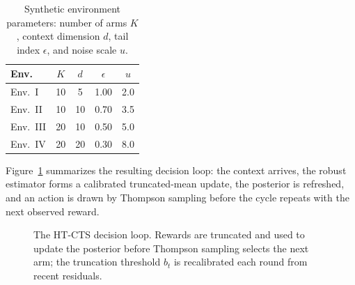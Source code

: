 \begin{table}[t]
  \centering
  \small
  \caption{Synthetic environment parameters: number of arms $K$, context dimension $d$, tail index $\epsilon$, and noise scale $u$.}
  \label{tab:envs}
  \vspace{0.4em}
  \begin{tabular}{lcccc}
    \toprule
    \textbf{Env.} & \textbf{$K$} & \textbf{$d$} & \textbf{$\epsilon$} & \textbf{$u$} \\
    \midrule
    Env.\ I   & 10 & 5  & 1.00 & 2.0 \\
    Env.\ II  & 10 & 10 & 0.70 & 3.5 \\
    Env.\ III & 20 & 10 & 0.50 & 5.0 \\
    Env.\ IV  & 20 & 20 & 0.30 & 8.0 \\
    \bottomrule
  \end{tabular}
\end{table}

Figure~\ref{fig:pipeline} summarizes the resulting decision loop: the context arrives, the robust estimator forms a calibrated truncated-mean update, the posterior is refreshed, and an action is drawn by Thompson sampling before the cycle repeats with the next observed reward.

\begin{figure}[t]
  \centering
  \caption{The HT-CTS decision loop. Rewards are truncated and used to update the posterior before Thompson sampling selects the next arm; the truncation threshold $b_t$ is recalibrated each round from recent residuals.}
  \label{fig:pipeline}
\end{figure}

